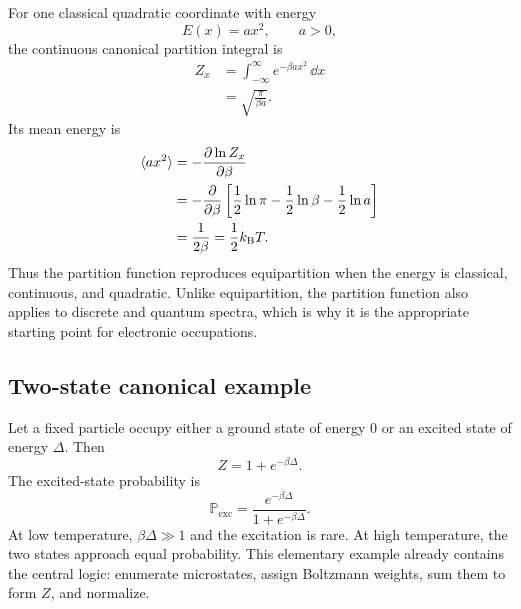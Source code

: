 For one classical quadratic coordinate with energy
\begin{equation}
  E(x)=ax^2,
  \qquad a>0,
  \label{eq:one-quadratic-coordinate-energy}
\end{equation}
the continuous canonical partition integral is
\begin{equation}
\begin{aligned}
  Z_x
  &=\int_{-\infty}^{\infty}e^{-\beta ax^2}\,\dd x\\
  &=\sqrt{\frac{\pi}{\beta a}}.
\end{aligned}
  \label{eq:gaussian-quadratic-partition-integral}
\end{equation}
Its mean energy is
\begin{equation}
\begin{aligned}
  \langle ax^2\rangle
  &=-\frac{\partial\ln Z_x}{\partial\beta}\\
  &=-\frac{\partial}{\partial\beta}
    \left[
      \frac12\ln\pi-\frac12\ln\beta-\frac12\ln a
    \right]\\
  &=\frac{1}{2\beta}
  =\frac12k_{\mathrm B} T.
\end{aligned}
  \label{eq:equipartition-from-partition-function}
\end{equation}
Thus the partition function reproduces equipartition when the energy is
classical, continuous, and quadratic.  Unlike equipartition, the partition
function also applies to discrete and quantum spectra, which is why it is the
appropriate starting point for electronic occupations.

\subsection{Two-state canonical example}

Let a fixed particle occupy either a ground state of energy $0$ or an excited
state of energy $\Delta$.  Then
\begin{equation}
  Z=1+e^{-\beta\Delta}.
  \label{eq:two-state-canonical-partition}
\end{equation}
The excited-state probability is
\begin{equation}
  \mathbb P_{\mathrm{exc}}
  =\frac{e^{-\beta\Delta}}{1+e^{-\beta\Delta}}.
  \label{eq:two-state-excited-probability}
\end{equation}
At low temperature, $\beta\Delta\gg1$ and the excitation is rare.  At high
temperature, the two states approach equal probability.  This elementary
example already contains the central logic: enumerate microstates, assign
Boltzmann weights, sum them to form $Z$, and normalize.

